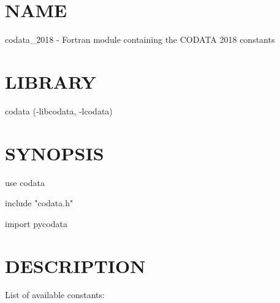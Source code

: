 \section*{NAME}
codata\_2018 - Fortran module containing the CODATA 2018 constants

\section*{LIBRARY}
codata (-libcodata, -lcodata)

\section*{SYNOPSIS}
{\ttfamily
use codata

include "codata.h"

import pycodata

}
\section*{DESCRIPTION}
List of available constants:

